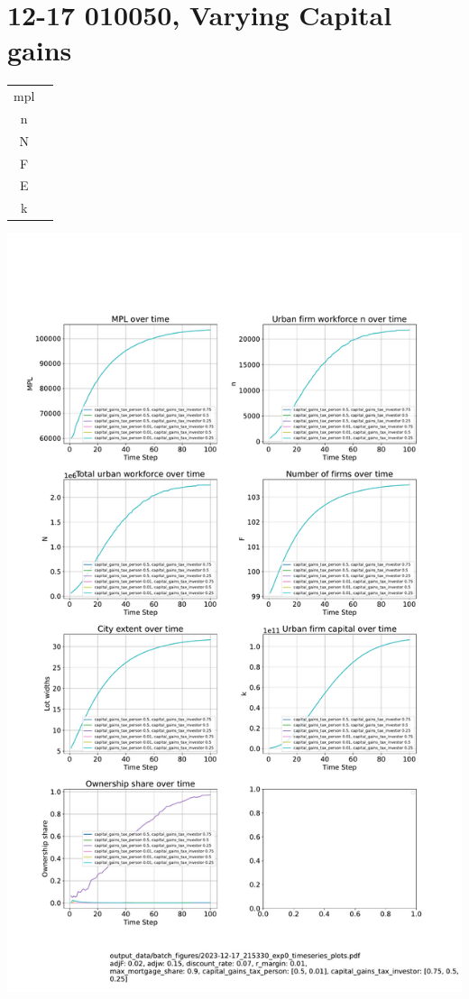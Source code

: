 \documentclass{article}
\begin{document}
\newpage


 \section{12-17 010050, Varying Capital gains  }
\begin{tabular}{c|c}
  mpl  &  \\
  n   &  \\
  N   &  \\
  F   &  \\
  E   &  \\
  k   & 
\end{tabular} 

\includegraphics[trim= 1.5cm 5cm 2cm 6.5cm, clip, scale=.40]{fig/Analysis/215330-exp0-timeseries-plots.pdf}



 
\end{document}
